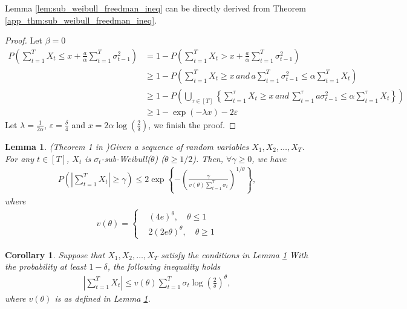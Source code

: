 \documentclass{article}
\newtheorem{lemma}{Lemma}
\newtheorem{corollary}{Corollary}
\begin{document}
 Lemma \ref{lem:sub_weibull_freedman_ineq} can be directly derived from Theorem \ref{app_thm:sub_weibull_freedman_ineq}.

 \begin{proof}
     Let $\beta=0$
\begin{align}
    P\left(\sum_{t=1}^T X_t \leq x + \frac{a}{\alpha}\sum_{t=1}^T \sigma_{t-1}^2 \right)&= 1-P\left(\sum_{t=1}^T X_t > x + \frac{a}{\alpha}\sum_{t=1}^T \sigma_{t-1}^2\right)\nonumber\\
    &\geq 1 - P\left(\sum_{t=1}^T X_t \geq x\, and \, a\sum_{t=1}^T \sigma_{t-1}^2\leq \alpha\sum_{t=1}^T X_t\right)\nonumber\\
    &\geq 1 - P\left(\bigcup_{\tau\in[T]}\left\{\sum_{t=1}^\tau X_t\geq x\,and\,\sum_{t=1}^\tau a \sigma_{t-1}^2\leq \alpha\sum_{t=1}^\tau X_t \right\}\right)\nonumber\\
    &\geq 1 - \exp(-\lambda x)-2\varepsilon
\end{align}
Let $\lambda = \frac{1}{2\alpha}$, $\varepsilon = \frac{\delta}{4}$ and $x = 2\alpha\log(\frac{2}{\delta})$, we finish the proof.
\end{proof}

\begin{lemma}{(Theorem 1 in \citep{Vladimirova_2020})}\label{app_lem:non_martingale_sub_weibull_freedman_ineq}
    Given a sequence of random variables $X_1,X_2,\dots,X_T$. For any $t\in[T]$, $X_t$ is $\sigma_t$-sub-Weibull($\theta$) ($\theta\geq 1/2$). Then, $\forall\gamma\geq0$, we have
    \begin{align}
        P\left(\left|\sum_{t=1}^T X_t\right|\geq\gamma\right)\leq 2\exp\left\{-\left(\frac{\gamma}{v(\theta)\sum_{t=1}^T\sigma_t}\right)^{1/\theta}\right\}, 
    \end{align}
    where 
    \begin{align}
        v(\theta) = \left\{\begin{aligned}
            &(4e)^\theta,\quad \theta\leq1\\
            &2(2e\theta)^\theta,\quad \theta\geq1
        \end{aligned}\right.
    \end{align}
\end{lemma}

\begin{corollary}\label{app_coro:non_martingale_sub_Weibull_freedman_ineq}
      Suppose that $X_1,X_2,\dots,X_T$ satisfy the conditions in Lemma \ref{app_lem:non_martingale_sub_weibull_freedman_ineq} With the probability at least $1-\delta$, the following inequality holds
     \begin{align}
         |\sum_{t=1}^T X_t|\leq v(\theta)\sum_{t=1}^T \sigma_t\log(\frac{2}{\delta})^\theta,
     \end{align}
     where $v(\theta)$ is as defined in Lemma \ref{app_lem:non_martingale_sub_weibull_freedman_ineq}.
\end{corollary}
\end{document}
